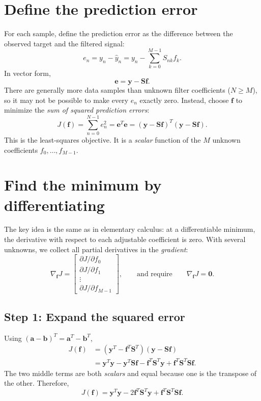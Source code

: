 \documentclass[11pt,letterpaper]{article}
\newcommand{\Smat}{\mathbf{S}}
\newcommand{\fvec}{\mathbf{f}}
\newcommand{\yvec}{\mathbf{y}}
\newcommand{\evec}{\mathbf{e}}
\begin{document}
\section{Define the prediction error}
For each sample, define the prediction error as the difference between the
observed target and the filtered signal:
\begin{equation}
    e_n=y_n-\widehat y_n=y_n-\sum_{k=0}^{M-1}S_{nk}f_k.
\end{equation}
In vector form,
\begin{equation}
    \boxed{\evec=\yvec-\Smat\fvec.}
\end{equation}
There are generally more data samples than unknown filter coefficients ($N\ge M$),
so it may not be possible to make every $e_n$ exactly zero.
Instead, choose $\fvec$ to minimize the \emph{sum of squared prediction errors}:
\begin{equation}
    \boxed{J(\fvec)=\sum_{n=0}^{N-1}e_n^2
    =\evec^T\evec
    =(\yvec-\Smat\fvec)^T(\yvec-\Smat\fvec).}
    \label{eq:cost}
\end{equation}
This is the least-squares objective. It is a \emph{scalar} function of the
$M$ unknown coefficients $f_0,\ldots,f_{M-1}$.

\section{Find the minimum by differentiating}
The key idea is the same as in elementary calculus: at a differentiable minimum,
the derivative with respect to each adjustable coefficient is zero.
With several unknowns, we collect all partial derivatives in the \emph{gradient}:
\begin{equation}
    \nabla_{\fvec}J=
    \begin{bmatrix}
    \partial J/\partial f_0\\
    \partial J/\partial f_1\\
    \vdots\\
    \partial J/\partial f_{M-1}
    \end{bmatrix},\qquad
    \text{and require}\qquad \nabla_{\fvec}J=\mathbf{0}.
\end{equation}

\subsection*{Step 1: Expand the squared error}
Using $(\mathbf{a}-\mathbf{b})^T=\mathbf{a}^T-\mathbf{b}^T$,
\begin{align}
J(\fvec)
&=(\yvec^T-\fvec^T\Smat^T)(\yvec-\Smat\fvec)\\
&=\yvec^T\yvec-\yvec^T\Smat\fvec
-\fvec^T\Smat^T\yvec+\fvec^T\Smat^T\Smat\fvec.
\end{align}
The two middle terms are both \emph{scalars} and equal because one is the
transpose of the other. Therefore,
\begin{equation}
    \boxed{J(\fvec)=\yvec^T\yvec
    -2\fvec^T\Smat^T\yvec
    +\fvec^T\Smat^T\Smat\fvec.}
    \label{eq:expanded}
\end{equation}
\end{document}
